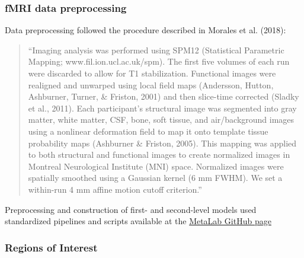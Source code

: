 \documentclass[12pt,twoside]{reedthesis}
\begin{document}
\hypertarget{fmri-data-preprocessing}{%
\subsubsection*{fMRI data preprocessing}\label{fmri-data-preprocessing}}

Data preprocessing followed the procedure described in Morales et al. (2018):
\begin{quote}
``Imaging analysis was performed using SPM12 (Statistical Parametric Mapping; www.fil.ion.ucl.ac.uk/spm). The first five volumes of each run were discarded to allow for T1 stabilization. Functional images were realigned and unwarped using local field maps (Andersson, Hutton, Ashburner, Turner, \& Friston, 2001) and then slice-time corrected (Sladky et al., 2011). Each participant's structural image was segmented into gray matter, white matter, CSF, bone, soft tissue, and air/background images using a nonlinear deformation field to map it onto template tissue probability maps (Ashburner \& Friston, 2005). This mapping was applied to both structural and functional images to create normalized images in Montreal Neurological Institute (MNI) space. Normalized images were spatially smoothed using a Gaussian kernel (6 mm FWHM). We set a within-run 4 mm affine motion cutoff criterion.''
\end{quote}
Preprocessing and construction of first- and second-level models used standardized pipelines and scripts available at the \href{https://github.com/metacoglab/MetaLabCore/}{MetaLab GitHub page}

\hypertarget{regions-of-interest}{%
\subsubsection*{Regions of Interest}\label{regions-of-interest}}
\end{document}
